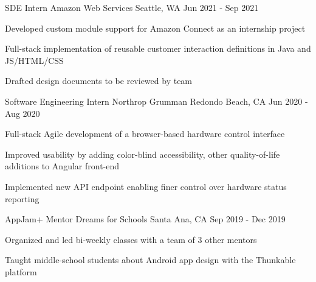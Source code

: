 
\begin{cventries}
	\cventry
	{SDE Intern}
	{Amazon Web Services}
	{Seattle, WA}
	{Jun 2021 - Sep 2021}
	{
		\begin{cvitems}
			\item{Developed custom module support for Amazon Connect as an internship project}
			\item{Full-stack implementation of reusable customer interaction definitions in Java and JS/HTML/CSS}
			\item{Drafted design documents to be reviewed by team}
		\end{cvitems}
	}
	\cventry
	{Software Engineering Intern}
	{Northrop Grumman}
	{Redondo Beach, CA}
	{Jun 2020 - Aug 2020}
	{
		\begin{cvitems}
			\item{Full-stack Agile development of a browser-based hardware control interface}
			\item{Improved usability by adding color-blind accessibility, other quality-of-life additions to Angular front-end}
			\item{Implemented new API endpoint enabling finer control over hardware status reporting}
		\end{cvitems}
	}

	\cventry
	{AppJam+ Mentor}
	{Dreams for Schools}
	{Santa Ana, CA}
	{Sep 2019 - Dec 2019}
	{
	\begin{cvitems}
		\item{Organized and led bi-weekly classes with a team of 3 other mentors}
		\item{Taught middle-school students about Android app design with the Thunkable platform}
	\end{cvitems}
	}
\end{cventries}
